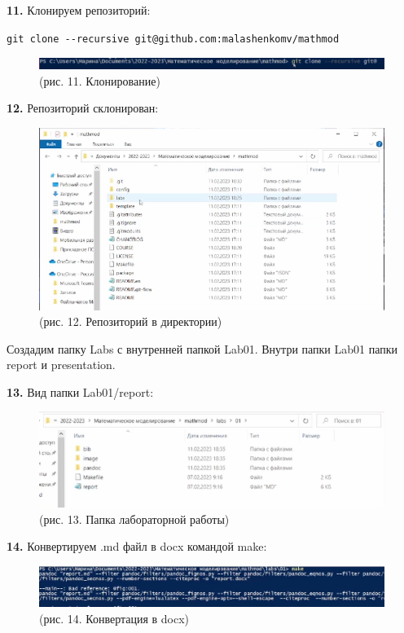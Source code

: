 \documentclass[
  12pt,
  a4paper,
]{scrreprt}
\begin{document}
\textbf{11.} Клонируем репозиторий:

\texttt{git\ clone\ -\/-recursive\ git@github.com:malashenkomv/mathmod}

\begin{figure}
\centering
\includegraphics{./tex2pdf.-cbf55669a78d292a/image/11.PNG}
\caption{(рис. 11. Клонирование)}
\end{figure}

\textbf{12.} Репозиторий склонирован:

\begin{figure}
\centering
\includegraphics{./tex2pdf.-cbf55669a78d292a/image/12.PNG}
\caption{(рис. 12. Репозиторий в директории)}
\end{figure}

Создадим папку Labs с внутренней папкой Lab01. Внутри папки Lab01 папки
report и presentation.

\textbf{13.} Вид папки Lab01/report:

\begin{figure}
\centering
\includegraphics{./tex2pdf.-cbf55669a78d292a/image/13.PNG}
\caption{(рис. 13. Папка лабораторной работы)}
\end{figure}

\textbf{14.} Конвертируем .md файл в docx командой make:

\begin{figure}
\centering
\includegraphics{./tex2pdf.-cbf55669a78d292a/image/14.PNG}
\caption{(рис. 14. Конвертация в docx)}
\end{figure}
\end{document}
